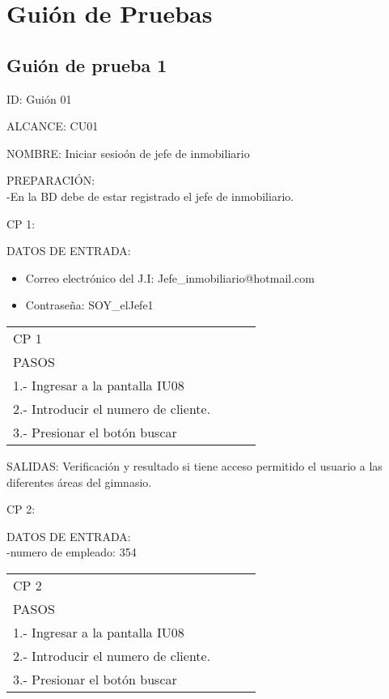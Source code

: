 \section{Guión de Pruebas}

\subsection{Guión de prueba 1}

\item ID: Guión 01
\item ALCANCE: CU01
\item NOMBRE: Iniciar sesioón de jefe de inmobiliario  
\item PREPARACIÓN:\\
-En la BD debe de estar registrado el jefe de inmobiliario.
\item CP 1:
\item DATOS DE ENTRADA:\\
	\begin{itemize}
		\item Correo electrónico del J.I: Jefe_inmobiliario@hotmail.com
		\item Contraseña: SOY_elJefe1
	\end{itemize}
\begin{center}			
	\begin{tabular}{|l|l|l|l|}
		\hline
		CP 1\\
		PASOS\\
		\hline 1.- Ingresar a la pantalla IU08\\
		\hline 2.- Introducir el numero de cliente.\\
		\hline 3.- Presionar el botón buscar\\
		\hline
	\end{tabular}
\end{center}
\item SALIDAS: Verificación y resultado si tiene acceso permitido el usuario a las diferentes 
áreas del gimnasio.
\item CP 2:
\item DATOS DE ENTRADA:\\
-numero de empleado: 354\\
\begin{center}			
	\begin{tabular}{|l|l|l|l|}
		\hline
		CP 2\\
		PASOS\\
		\hline 1.- Ingresar a la pantalla IU08\\
		\hline 2.- Introducir el numero de cliente.\\
		\hline 3.- Presionar el botón buscar\\
		\hline
	\end{tabular}
\end{center}
